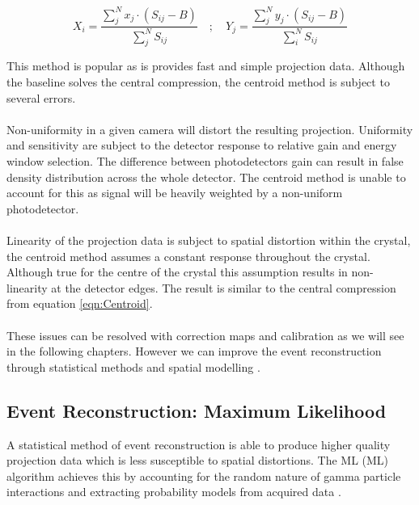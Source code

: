 \begin{equation} \label{eqn:ModCent}
        X_{i} = \frac{\sum^{N}_{j} x_{j} \cdot (S_{ij} - B)}{\sum^{N}_{j} S_{ij}} \quad ; \quad  Y_{j} = \frac{\sum^{N}_{j} y_{j} \cdot (S_{ij} - B)}{\sum^{N}_{i} S_{ij}}
\end{equation}

This method is popular as is provides fast and simple projection data. Although the baseline solves the central compression, the centroid method is subject to several errors. 
\paragraph{}
Non-uniformity in a given camera will distort the resulting projection. Uniformity and sensitivity are subject to the detector response to relative gain and energy window selection. The difference between photodetectors gain can result in false density distribution across the whole detector. The centroid method is unable to account for this as signal will be heavily weighted by a non-uniform photodetector. 
\paragraph{}
Linearity of the projection data is subject to spatial distortion within the crystal, the centroid method assumes a constant response throughout the crystal. Although true for the centre of the crystal this assumption results in non-linearity at the detector edges. The result is similar to the central compression from equation \ref{eqn:Centroid}.
\paragraph{}
These issues can be resolved with correction maps and calibration \cite{Miller2012AImagers} \cite{Jin1995CalibrationsMcSPECT-II} as we will see in the following chapters. However we can improve the event reconstruction through statistical methods and spatial modelling \cite{Morozov2015IterativeCamera}. 

\subsection{Event Reconstruction: Maximum Likelihood}
A statistical method of event reconstruction is able  to produce higher quality projection data which is less susceptible to spatial distortions. The \acrlong{ML} (\acrshort{ML}) algorithm achieves this by accounting for the random nature of gamma particle interactions and extracting probability models from acquired data \cite{4307558} \cite{JinhunJoung2000ImplementationCameras}.
